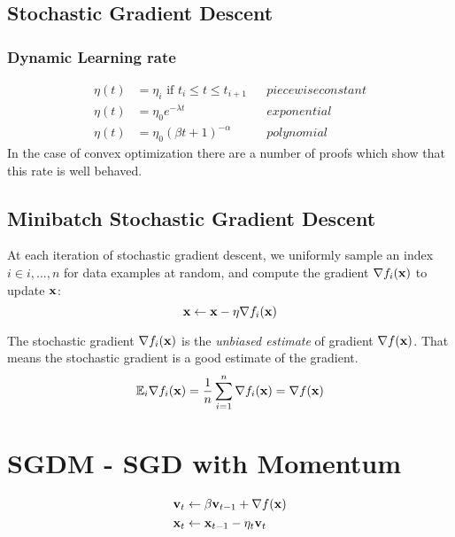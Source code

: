 \subsection{Stochastic Gradient Descent}
\subsubsection{Dynamic Learning rate}

\begin{equation}
    \begin{aligned}
        \eta(t) & = \eta_i \text{ if } t_i \leq  t \leq t_{i+1} &  & piecewise constant \\
        \eta(t) & = \eta_0 e^{-\lambda t}                       &  & exponential        \\
        \eta(t) & = \eta_0 (\beta t + 1) ^{-\alpha}             &  & polynomial
    \end{aligned}
\end{equation}
In the case of convex optimization there are a number of proofs which show that this rate is well behaved.

\subsection{Minibatch Stochastic Gradient Descent}
At each iteration of stochastic gradient descent, we uniformly sample an index $i \in {i,..., n}$ for data examples at
random, and compute the gradient $\nabla f_i(\mathbf{x})$ to update $\mathbf{x}$:
\begin{equation}
    \mathbf{x} \leftarrow \mathbf{x} - \eta \nabla f_i(\mathbf{x})
\end{equation}

The stochastic gradient $\nabla f_i(\mathbf{x})$ is the \textit{unbiased estimate} of gradient $\nabla f(\mathbf{x})$.
That means the stochastic gradient is a good estimate of the gradient.
\begin{equation}
    \mathbb{E}_i \nabla f_i(\mathbf{x}) = \frac{1}{n} \sum_{i=1}^n \nabla f_i (\mathbf{x}) = \nabla f(\mathbf{x})
\end{equation}

\section{SGDM - SGD with Momentum}

\begin{equation}
    \begin{split}
        \mathbf{v}_t &\leftarrow \beta \mathbf{v}_{t-1} + \nabla f(\mathbf{x}) \\
        \mathbf{x}_t &\leftarrow \mathbf{x}_{t-1} - \eta_t \mathbf{v}_{t}
    \end{split}
\end{equation}

